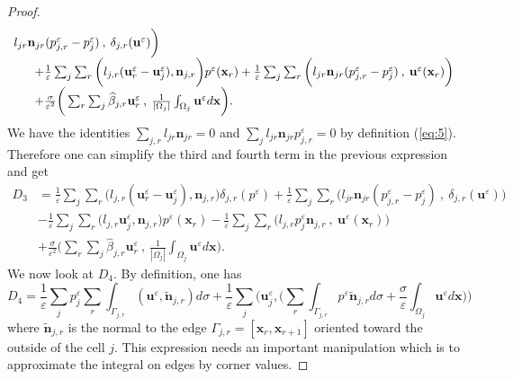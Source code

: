 \documentclass[a4paper,french,english,10pt]{article}
\newcommand\ljr{l_{jr}}
\newcommand\njr{\mathbf{n}_{jr}}
\newcommand\tnjr{\mathbf{\tilde{n}}_{j,r}}
\newcommand\uu{\mathbf{u}}
\newcommand\eps{\varepsilon}
\newcommand\x{\mathbf{x}}
\begin{document}
\begin{proof}
\begin{equation*}
\begin{array}{l}
l_{jr} \mathbf n_{jr} (p_{j,r}^{\eps}
-
p_j^{\eps}) \: ,
\:\delta_{j,r}(\uu^{\eps}) \bigg) \\
\hspace{0.6cm}+ \frac{1}{\eps} \sum_j \sum_r \bigg(
l_{j,r}(\textbf{u}_r^{\eps}-\textbf{u}_j^{\eps}),\textbf{n}_{j,r} \bigg)
p^{\eps}(\x_r)+ \frac{1}{\eps} \sum_j \sum_r \bigg(  
l_{jr} \mathbf n_{jr} (p_{j,r}^{\eps}
-
p_j^{\eps})  \: , \:  \uu^{\eps}(\textbf{x}_{r}) \bigg) \\
\hspace{0.6cm}+\frac{\sigma}{\eps^2} \bigg( \sum_r \sum_j
\widehat{\beta}_{j,r}\textbf{u}_r^{\eps}  \: , \:
\frac{1}{|\Omega_j|}\int_{\Omega_j} \uu^{\eps} d\x \bigg) .
\end{array}
\end{equation*}
We have the identities $\sum_{j,r}\ljr \njr 
=0$
and  $\sum_j  l_{jr} \mathbf n_{jr} p_{j,r}^{\eps}=0$ by definition
(\ref{eq:5}).
Therefore one can simplify the third and fourth term
in the previous expression and get 
\begin{equation*}
\begin{aligned}
D_3  & =  \frac{1}{\eps} \sum_j \sum_r \bigg(
l_{j,r}(\textbf{u}_r^{\eps}-\textbf{u}_j^{\eps}),\textbf{n}_{j,r} \bigg)
\delta_{j,r}(p^{\eps})+\frac{1}{\eps} \sum_j \sum_r \bigg( 
l_{jr} \mathbf n_{jr} (p_{j,r}^{\eps}
-
p_j^{\eps}) \: , \:
\delta_{j,r}(\uu^{\eps}) \bigg) \\
& - \frac{1}{\eps} \sum_j \sum_r \bigg(
l_{j,r}\textbf{u}_j^{\eps},\textbf{n}_{j,r} \bigg) p^{\eps}(\x_r)- \frac{1}{\eps}
\sum_j \sum_r \bigg( l_{j,r}p_j^{\eps}\textbf{n}_{j,r} \: ,\:
\uu^{\eps}(\textbf{x}_{r}) \bigg)\\
 & + \frac{\sigma}{\eps^2} \bigg( \sum_r
\sum_j\widehat{\beta}_{j,r}\textbf{u}_r^{\eps}  \: , \:
\frac{1}{|\Omega_j|}\int_{\Omega_j} \uu^{\eps} d\x \bigg) .
\end{aligned}
\end{equation*}
We now look at $D_4$. By definition, one has
\begin{equation*}
D_4= \frac{1}{\eps}\sum_j p_j^{\eps} \sum_r \int_{\Gamma_{j,r}}
(\uu^{\eps},\tnjr)d\sigma + \frac{1}{\eps}\sum_j
\bigg( \textbf{u}_j^{\eps} , \bigg( \sum_r \int_{\Gamma_{j,r}} p^{\eps}
\tnjr d\sigma
+\frac{\sigma}{\eps}\int_{\Omega_j}\uu^{\eps} d\x\bigg) \bigg)
\end{equation*}
where $\tnjr$ is the normal to the edge
$\Gamma_{j,r}=[\x_{r},\x_{r+1}]$ oriented toward the outside of the cell $j$. 
This expression needs an important manipulation which
is to approximate the integral on edges by corner values.

\end{proof}
\end{document}
